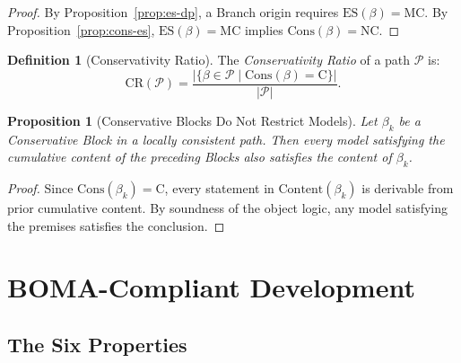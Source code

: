 \documentclass[12pt, a4paper]{article}
\theoremstyle{plain}
\newtheorem{proposition}[theorem]{Proposition}
\theoremstyle{definition}
\newtheorem{definition}[theorem]{Definition}
\theoremstyle{remark}
\newcommand{\BOMA}{\textsf{BOMA}}
\newcommand{\ES}[1]{\mathrm{ES}(#1)}
\newcommand{\Cons}[1]{\mathrm{Cons}(#1)}
\newcommand{\CR}[1]{\mathrm{CR}(#1)}
\newcommand{\MC}{\mathrm{MC}}
\newcommand{\C}{\mathrm{C}}
\newcommand{\NC}{\mathrm{NC}}
\begin{document}
\begin{proof}
By Proposition~\ref{prop:es-dp}, a Branch origin requires
$\ES{\beta} = \MC$. By Proposition~\ref{prop:cons-es},
$\ES{\beta} = \MC$ implies $\Cons{\beta} = \NC$.
\end{proof}

\begin{definition}[Conservativity Ratio]
\label{def:cr}
The \emph{Conservativity Ratio} of a path $\mathcal{P}$ is:
\[
  \CR{\mathcal{P}}
  = \frac{|\{\beta \in \mathcal{P} \mid \Cons{\beta} = \C\}|}
         {|\mathcal{P}|}.
\]
\end{definition}

\begin{proposition}[Conservative Blocks Do Not Restrict Models]
\label{prop:cons-models}
Let $\beta_k$ be a Conservative Block in a locally consistent path.
Then every model satisfying the cumulative content of the preceding
Blocks also satisfies the content of $\beta_k$.
\end{proposition}

\begin{proof}
Since $\Cons{\beta_k} = \C$, every statement in
$\mathrm{Content}(\beta_k)$ is derivable from prior cumulative
content. By soundness of the object logic, any model satisfying the
premises satisfies the conclusion.
\end{proof}

\section{\BOMA{}-Compliant Development}
\label{sec:compliance}

\subsection{The Six Properties}
\label{subsec:six}
\end{document}
